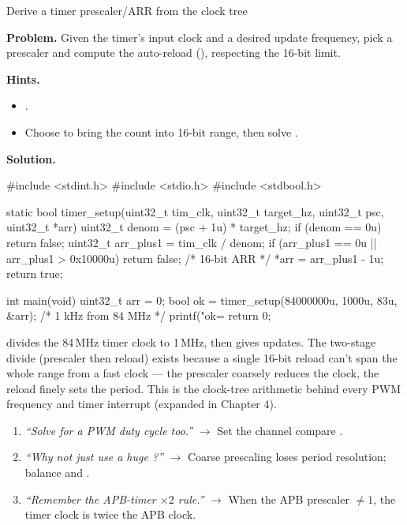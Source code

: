\begin{gymproblem}{Derive a timer prescaler/ARR from the clock tree}

\textbf{Problem.} Given the timer's input clock and a desired update frequency,
pick a prescaler and compute the auto-reload (), respecting the
16-bit limit.

\textbf{Hints.}
\begin{itemize}
\item {}.
\item Choose  to bring the count into 16-bit range, then solve
  .
\end{itemize}

\attempt

\textbf{Solution.}
\begin{cgym}
#include <stdint.h>
#include <stdio.h>
#include <stdbool.h>

static bool timer_setup(uint32_t tim_clk, uint32_t target_hz, uint32_t psc,
                        uint32_t *arr) {
    uint32_t denom = (psc + 1u) * target_hz;
    if (denom == 0u) return false;
    uint32_t arr_plus1 = tim_clk / denom;
    if (arr_plus1 == 0u || arr_plus1 > 0x10000u) return false;  /* 16-bit ARR */
    *arr = arr_plus1 - 1u;
    return true;
}

int main(void) {
    uint32_t arr = 0;
    bool ok = timer_setup(84000000u, 1000u, 83u, &arr);   /* 1 kHz from 84 MHz */
    printf("ok=%
    return 0;
}
\end{cgym}

 divides the 84\,MHz timer clock to 1\,MHz, then 
gives  updates. The two-stage divide (prescaler
then reload) exists because a single 16-bit reload can't span the whole range
from a fast clock --- the prescaler coarsely reduces the clock, the reload
finely sets the period. This is the clock-tree arithmetic behind every PWM
frequency and timer interrupt (expanded in Chapter 4).

\followups
\begin{enumerate}
\item \emph{``Solve for a PWM duty cycle too.''} $\rightarrow$ Set the channel
  compare .
\item \emph{``Why not just use a huge ?''} $\rightarrow$ Coarse
  prescaling loses period resolution; balance  and .
\item \emph{``Remember the APB-timer $\times2$ rule.''} $\rightarrow$ When the
  APB prescaler $\neq 1$, the timer clock is twice the APB clock.
\end{enumerate}
\end{gymproblem}

